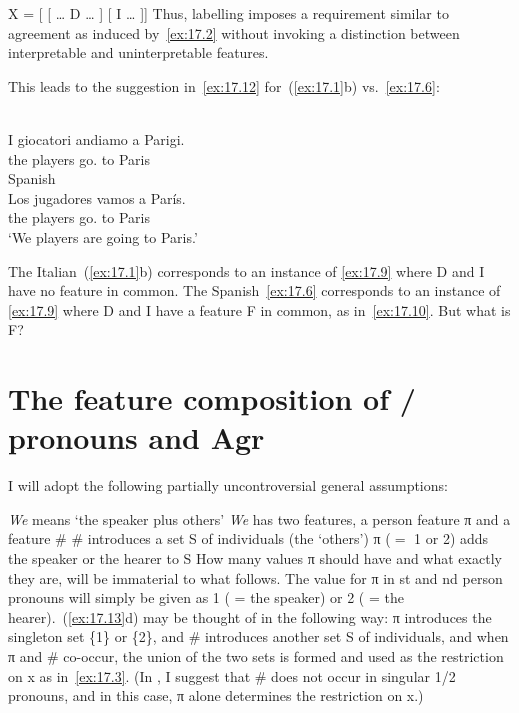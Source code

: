 \documentclass[output=paper]{langsci/langscibook}
\begin{document}
\ea\label{ex:17.11}
    X = [ [ \dots{} D \dots{} ] [ I \dots{} ]]
\z
Thus, labelling imposes a requirement similar to agreement as induced
by~\eqref{ex:17.2} without invoking a distinction between interpretable and
uninterpretable features.

This leads to the suggestion in~\eqref{ex:17.12} for~(\ref{ex:17.1}b) vs.\
\eqref{ex:17.6}:

\begin{exe}
     \\
    \gll I giocatori andiamo a Parigi.\\
    the players go.\Fpl{} to Paris\\
    \glt
\exi{\eqref{ex:17.6}} Spanish\\
    \gll    Los jugadores vamos a París.\\
            the players      go.\Fpl{} to Paris\\
    \glt    ‘We players are going to Paris.’\\
\end{exe}

\ea\label{ex:17.12}
    \ea The Italian~(\ref{ex:17.1}b) corresponds to an instance of
    \eqref{ex:17.9} where D and I have no feature in common.
    \ex The Spanish~\eqref{ex:17.6} corresponds to an instance of
    \eqref{ex:17.9} where D and I have a feature F in common, as
    in~\eqref{ex:17.10}.
    \z
\z
But what is F?

\section{The feature composition of \First/\Spl{} pronouns and
Agr}\label{sec:17.3}

I will adopt the following partially uncontroversial general assumptions:

\ea\label{ex:17.13}
    \ea \emph{We} means ‘the speaker plus others’
    \ex \emph{We} has two features, a person feature π and a feature \#
    \ex \# introduces a set S of individuals (the ‘others’)
    \ex π ($=$ 1 or 2) adds the speaker or the hearer to S
    \z
\z
How many values π should have and what exactly they are, will be immaterial
to what follows. The value for π in \First{}st and \Second{}nd person
pronouns will simply be given as 1 ( = the speaker) or 2 ( = the
hearer).~(\ref{ex:17.13}d) may be thought of in the following way: π
introduces the singleton set \{1\} or \{2\}, and \# introduces another set S of
individuals, and when π and \# co-occur, the union of the two sets is
formed and used as the restriction on x as in~\eqref{ex:17.3}. (In , I
suggest that \# does not occur in singular 1/2 pronouns, and in this case,
π alone determines the restriction on x.)
\end{document}
